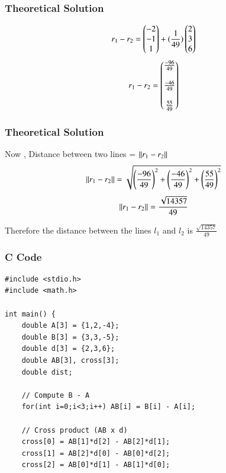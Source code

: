 \documentclass{beamer}
\begin{document}
\begin{frame}
\frametitle{Theoretical Solution}
  \begin{align}
      r_1-r_2=\begin{pmatrix}-2\\-1\\1\end{pmatrix}+(\frac{1}{49})\begin{pmatrix}2\\3\\6\end{pmatrix}
\end{align}
\begin{align}
       r_1-r_2=\begin{pmatrix}\frac{-96}{49}\\\\\frac{-46}{49}\\\\\frac{55}{49}\end{pmatrix}
\end{align}




\end{frame}

\begin{frame}
\frametitle{Theoretical Solution}
 Now , Distance between two lines = $\left\lVert r_1-r_2\right\rVert$
\begin{align}
    \left\lVert r_1-r_2\right\rVert=\sqrt{\left(\frac{-96}{49}\right)^2+\left(\frac{-46}{49}\right)^2+\left(\frac{55}{49}\right)^2}
\end{align}
\begin{align}
       \left\lVert r_1-r_2\right\rVert=\frac{\sqrt{14357}}{49}
\end{align}


Therefore the distance between the lines $l_1$ and $l_2$ is $\frac{\sqrt{14357}}{49}$

\end{frame}






\begin{frame}[fragile]
    \frametitle{C Code  }

    \begin{lstlisting}
#include <stdio.h>
#include <math.h>

int main() {
    double A[3] = {1,2,-4};
    double B[3] = {3,3,-5};
    double d[3] = {2,3,6};
    double AB[3], cross[3];
    double dist;

    // Compute B - A
    for(int i=0;i<3;i++) AB[i] = B[i] - A[i];

    // Cross product (AB x d)
    cross[0] = AB[1]*d[2] - AB[2]*d[1];
    cross[1] = AB[2]*d[0] - AB[0]*d[2];
    cross[2] = AB[0]*d[1] - AB[1]*d[0];

    


    \end{lstlisting}
\end{frame}
\end{document}
